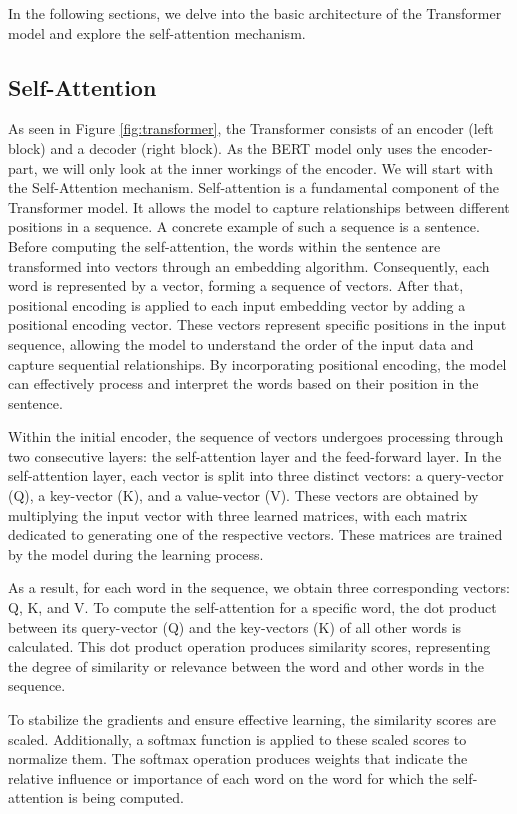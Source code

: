 \documentclass[12pt,oneside,bibtotoc,liststotoc]{scrbook}
\begin{document}
In the following sections, we delve into the basic architecture of the Transformer model and explore the self-attention mechanism.

\subsection{Self-Attention}
As seen in Figure \ref{fig:transformer}, the Transformer consists of an encoder (left block) and a decoder (right block). As the BERT model only uses the encoder-part, we will only look at the inner workings of the encoder. We will start with the Self-Attention mechanism.
Self-attention is a fundamental component of the Transformer model. It allows the model to capture relationships between different positions in a sequence. A concrete example of such a sequence is a sentence. Before computing the self-attention, the words within the sentence are transformed into vectors through an embedding algorithm. Consequently, each word is represented by a vector, forming a sequence of vectors. After that, positional encoding is applied to each input embedding vector by adding a positional encoding vector. These vectors represent specific positions in the input sequence, allowing the model to understand the order of the input data and capture sequential relationships. By incorporating positional encoding, the model can effectively process and interpret the words based on their position in the sentence.

Within the initial encoder, the sequence of vectors undergoes processing through two consecutive layers: the self-attention layer and the feed-forward layer. In the self-attention layer, each vector is split into three distinct vectors: a query-vector (Q), a key-vector (K), and a value-vector (V). These vectors are obtained by multiplying the input vector with three learned matrices, with each matrix dedicated to generating one of the respective vectors. These matrices are trained by the model during the learning process.

As a result, for each word in the sequence, we obtain three corresponding vectors: Q, K, and V. To compute the self-attention for a specific word, the dot product between its query-vector (Q) and the key-vectors (K) of all other words is calculated. This dot product operation produces similarity scores, representing the degree of similarity or relevance between the word and other words in the sequence.

To stabilize the gradients and ensure effective learning, the similarity scores are scaled. Additionally, a softmax function is applied to these scaled scores to normalize them. The softmax operation produces weights that indicate the relative influence or importance of each word on the word for which the self-attention is being computed.
\end{document}

